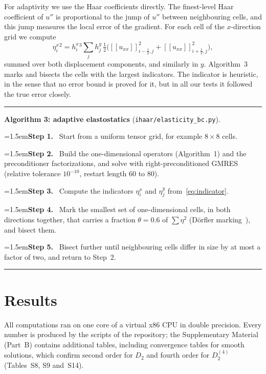 \documentclass[preprint,12pt]{elsarticle}
\theoremstyle{remark}
\newcommand{\step}[1]{\par\noindent\hangindent=1.5em\hangafter=1\textbf{Step #1.}\ }
\begin{document}
For adaptivity we use the Haar coefficients directly. The finest-level Haar coefficient of $u''$ is
proportional to the jump of $u''$ between neighbouring cells, and this jump measures the local error of
the gradient. For each cell of the $x$-direction grid we compute
\begin{equation}\label{eq:indicator}
\eta^x_i{}^2=h^x_i{}^3\sum_jh^y_j\,\tfrac12\Big([\![u_{xx}]\!]_{i-\frac12,j}^2+[\![u_{xx}]\!]_{i+\frac12,j}^2\Big),
\end{equation}
summed over both displacement components, and similarly in $y$. Algorithm~3 marks and bisects the cells
with the largest indicators. The indicator is heuristic, in the sense that no error bound is proved for it,
but in all our tests it followed the true error closely.

\begin{algorithm}[t]\small\hrule\smallskip
\noindent\textbf{Algorithm 3: adaptive elastostatics} (\texttt{ihaar/elasticity\_bc.py}).
\step{1} Start from a uniform tensor grid, for example $8\times8$ cells.
\step{2} Build the one-dimensional operators (Algorithm~1) and the preconditioner factorizations, and solve with right-preconditioned GMRES (relative tolerance $10^{-10}$, restart length 60 to 80).
\step{3} Compute the indicators $\eta^x_i$ and $\eta^y_j$ from~\eqref{eq:indicator}.
\step{4} Mark the smallest set of one-dimensional cells, in both directions together, that carries a fraction $\theta=0.6$ of $\sum\eta^2$ (D\"orfler marking~\cite{dorfler1996convergent}), and bisect them.
\step{5} Bisect further until neighbouring cells differ in size by at most a factor of two, and return to Step~2.
\smallskip\hrule
\end{algorithm}

\section{Results}\label{sec:results}
All computations ran on one core of a virtual x86 CPU in double precision. Every number is produced by
the scripts of the repository; the Supplementary Material (Part~B) contains additional tables, including
convergence tables for smooth solutions, which confirm second order for $D_2$ and fourth order for
$D_2^{(4)}$ (Tables~S8, S9 and~S14).
\end{document}
